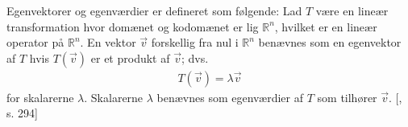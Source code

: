 
Egenvektorer og egenværdier er defineret som følgende: Lad $T$ være en lineær transformation hvor domænet og kodomænet er lig $\mathbb{R}^n$, hvilket er en lineær operator på $\mathbb{R}^n$. En vektor $\vec{v}$ forskellig fra nul i $\mathbb{R}^n$ benævnes som en egenvektor af $T$ hvis $T(\vec{v})$ er et produkt af $\vec{v}$; dvs.
\begin{align}
T(\vec{v})=\lambda\vec{v}
\end{align}
for skalarerne $\lambda$. Skalarerne $\lambda$ benævnes som egenværdier af $T$ som tilhører $\vec{v}$. [\cite{linalg}, s. 294]

